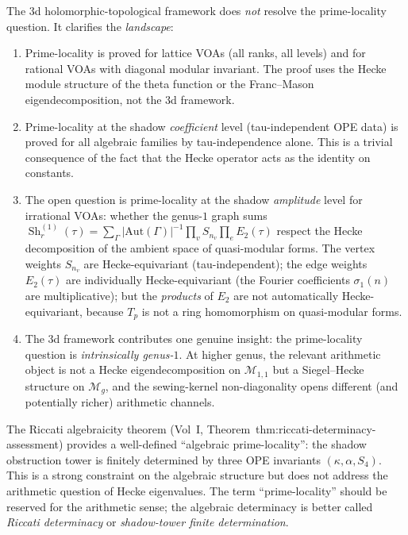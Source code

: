 \begin{remark}%
\label{rem:3d-prime-locality-assessment}%
The $3$d holomorphic-topological framework does \emph{not}
resolve the prime-locality question. It clarifies the
\emph{landscape}:
\begin{enumerate}[label=\textup{(\roman*)}]
\item Prime-locality is proved for lattice VOAs
 (all ranks, all levels) and for rational VOAs with diagonal
 modular invariant. The proof uses the Hecke module structure
 of the theta function or the Franc--Mason eigendecomposition,
 not the $3$d framework.

\item Prime-locality at the shadow \emph{coefficient} level
 (tau-independent OPE data) is proved for all algebraic families
 by tau-independence alone. This is a trivial consequence of
 the fact that the Hecke operator acts as the identity on
 constants.

\item The open question is prime-locality at the shadow
 \emph{amplitude} level for irrational VOAs: whether the
 genus-$1$ graph sums
 $\operatorname{Sh}_r^{(1)}(\tau) =
 \sum_\Gamma |\mathrm{Aut}(\Gamma)|^{-1}
 \prod_{v} S_{n_v} \prod_{e} E_2(\tau)$
 respect the Hecke decomposition of the ambient space of
 quasi-modular forms. The vertex weights $S_{n_v}$ are
 Hecke-equivariant (tau-independent); the edge weights
 $E_2(\tau)$ are individually Hecke-equivariant (the
 Fourier coefficients $\sigma_1(n)$ are multiplicative); but
 the \emph{products} of $E_2$ are not automatically
 Hecke-equivariant, because $T_p$ is not a ring homomorphism
 on quasi-modular forms.

\item The $3$d framework contributes one genuine insight:
 the prime-locality question is \emph{intrinsically genus-$1$}.
 At higher genus, the relevant arithmetic object is not a
 Hecke eigendecomposition on $\mathcal{M}_{1,1}$ but a
 Siegel--Hecke structure on $\mathcal{M}_g$, and the
 sewing-kernel non-diagonality opens different
 (and potentially richer) arithmetic channels.
\end{enumerate}

The Riccati algebraicity theorem
(Vol~I, Theorem~thm:riccati-determinacy-assessment)
provides a well-defined ``algebraic prime-locality'': the
shadow obstruction tower is finitely determined by three OPE invariants
$(\kappa, \alpha, S_4)$. This is a strong constraint on the
algebraic structure but does not address the arithmetic question
of Hecke eigenvalues. The term ``prime-locality'' should be
reserved for the arithmetic sense; the algebraic determinacy
is better called \emph{Riccati determinacy} or
\emph{shadow-tower finite determination}.
\end{remark}

